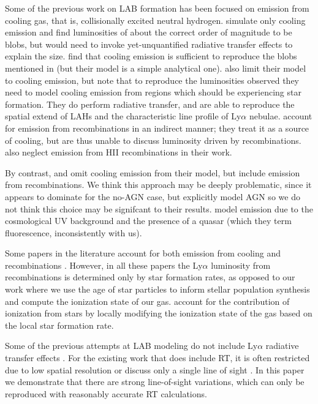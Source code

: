 Some of the previous work on LAB formation has been focused on emission from cooling gas, that is, collisionally excited neutral hydrogen.
\citet{Fardal2001} simulate only cooling emission and find luminosities of about the correct order of magnitude to be blobs, but would need to invoke yet-unquantified radiative transfer effects to explain the size.
\citet{Haiman2000} find that cooling emission is sufficient to reproduce the blobs mentioned in \citet{Steidel2000} (but their model is a simple analytical one).
\citet{Faucher-Giguere2010} also limit their model to cooling emission, but note that to reproduce the luminosities observed they need to model cooling emission from regions which should be experiencing star formation.
They do perform radiative transfer, and are able to reproduce the spatial extend of LAHs and the characteristic line profile of Ly$\alpha$ nebulae.
\citet{Rosdahl2012} account for emission from recombinations in an indirect manner; they treat it as a source of cooling, but are thus unable to discuss luminosity driven by recombinations.
\citet{Goerdt2010} also neglect emission from HII recombinations in their work.

By contrast, \citet{Cantalupo2005} and \citet{Gronke2017} omit cooling emission from their model, but include emission from recombinations.
We think this approach may be deeply problematic, since it appears to dominate for the no-AGN case, but \citet{Gronke2017} explicitly model AGN so we do not think this choice may be signifcant to their results.
\citet{Kollmeier2010} model emission due to the cosmological UV background and the presence of a quasar (which they term fluorescence, inconsistently with us). 

Some papers in the literature account for both emission from cooling and recombinations \citep{Cen2013, Furlanetto2005, Geach2016, Smailagi2016}.
However, in all these papers the Ly$\alpha$ luminosity from recombinations is determined only by star formation rates, as opposed to our work where we use the age of star particles to inform stellar population synthesis and compute the ionization state of our gas.
\citet{Geach2016} account for the contribution of ionization from stars by locally modifying the ionization state of the gas based on the local star formation rate.

Some of the previous attempts at LAB modeling do not include Ly$\alpha$ radiative transfer effects \citep{Fardal2001, Furlanetto2005, Goerdt2010, Smailagi2016, Rosdahl2012}.
For the existing work that does include RT, it is often restricted due to low spatial resolution \citep{Cen2013} or discuss only a single line of sight \citep{Cantalupo2005}.
In this paper we demonstrate that there are strong line-of-sight variations, which can only be reproduced with reasonably accurate RT calculations.

